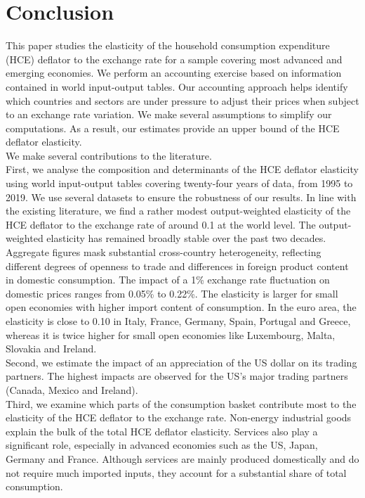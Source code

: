 \documentclass[11pt,a4paper]{paper} %
\begin{document}
\section{Conclusion}
\label{sec:ccl}
This paper studies the elasticity of the household consumption expenditure (HCE) deflator to the exchange rate for a sample covering most advanced and emerging economies.
We perform an accounting exercise based on information contained in world input-output tables.
Our accounting approach helps identify which countries and sectors are under pressure to adjust their prices when subject to an exchange rate variation.
We make several assumptions to simplify our computations.
As a result, our estimates provide an upper bound of the HCE deflator elasticity. \\
We make several contributions to the literature. \\
First, we analyse the composition and determinants of the HCE deflator elasticity using world input-output tables covering twenty-four years of data, from 1995 to 2019. 
We use several datasets to ensure the robustness of our results.
In line with the existing literature, we find a rather modest output-weighted elasticity of the HCE deflator to the exchange rate of around 0.1 at the world level.
The output-weighted elasticity has remained broadly stable over the past two decades.
Aggregate figures mask substantial cross-country heterogeneity, reflecting different degrees of openness to trade and differences in foreign product content in domestic consumption. 
The impact of a 1\% exchange rate fluctuation on domestic prices ranges from 0.05\% to 0.22\%.
The elasticity is larger for small open economies with higher import content of consumption. 
In the euro area, the elasticity is close to 0.10 in Italy, France, Germany, Spain, Portugal and Greece, whereas it is twice higher for small open economies like Luxembourg, Malta, Slovakia and Ireland.\\
Second, we estimate the impact of an appreciation of the US dollar on its trading partners. 
The highest impacts are observed for the US’s major trading partners (Canada, Mexico and Ireland).\\
Third, we examine which parts of the consumption basket contribute most to the elasticity of the HCE deflator to the exchange rate. 
Non-energy industrial goods explain the bulk of the total HCE deflator elasticity. 
Services also play a significant role, especially in advanced economies such as the US, Japan, Germany and France.
Although services are mainly produced domestically and do not require much imported inputs, they account for a substantial share of total consumption.
\end{document}
